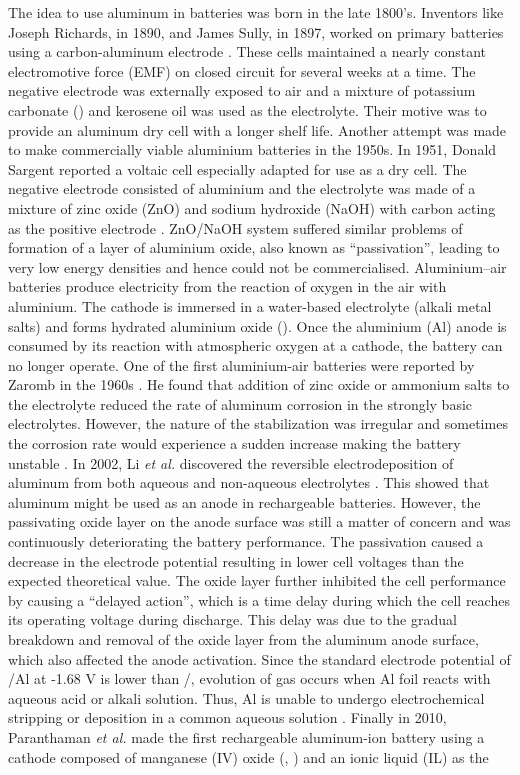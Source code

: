 The idea to use aluminum in batteries was born in the late 1800's. Inventors like Joseph Richards, in 1890, and James Sully, in 1897, worked on primary batteries using a carbon-aluminum electrode \cite{noauthor_james_1897, richards_aluminium_1890}. These cells maintained a nearly constant electromotive force (EMF) on closed circuit for several weeks at a time. The negative electrode was externally exposed to air and a mixture of potassium carbonate () and kerosene oil was used as the electrolyte. Their motive was to provide an aluminum dry cell with a longer shelf life. Another attempt was made to make commercially viable aluminium batteries in the 1950s. In 1951, Donald Sargent reported a voltaic cell especially adapted for use as a dry cell. The negative electrode consisted of aluminium and the electrolyte was made of a mixture of zinc oxide (ZnO) and sodium hydroxide (NaOH) with carbon acting as the positive electrode \cite{sargent_voltaic_1951}. ZnO/NaOH system suffered similar problems of formation of a layer of aluminium oxide, also known as \enquote{passivation}, leading to very low energy densities and hence could not be commercialised. Aluminium–air batteries produce electricity from the reaction of oxygen in the air with aluminium. The cathode is immersed in a water-based electrolyte (alkali metal salts) and forms hydrated aluminium oxide (). Once the aluminium (Al) anode is consumed by its reaction with atmospheric oxygen at a cathode, the battery can no longer operate. One of the first aluminium-air batteries were reported by Zaromb in the 1960s \cite{zaromb_use_1962}. He found that addition of zinc oxide or ammonium salts to the electrolyte reduced the rate of aluminum corrosion in the strongly basic electrolytes. However, the nature of the stabilization was irregular and sometimes the corrosion rate would experience a sudden increase making the battery unstable \cite{bockstie_control_1963}. In 2002, Li \textit{et al.} discovered the reversible electrodeposition of aluminum from both aqueous and non-aqueous electrolytes \cite{li_aluminum_2002}. This showed that aluminum might be used as an anode in rechargeable batteries. However, the passivating oxide layer on the anode surface was still a matter of concern and was continuously deteriorating the battery performance. The passivation caused a decrease in the electrode potential resulting in lower cell voltages than the expected theoretical value. The oxide layer further inhibited the cell performance by causing a \enquote{delayed action}, which is a time delay during which the cell reaches its operating voltage during discharge. This delay was due to the gradual breakdown and removal of the oxide layer from the aluminum anode surface, which also affected the anode activation. Since the standard electrode potential of /Al at -1.68 V is lower than /, evolution of  gas occurs when Al foil reacts with aqueous acid or alkali solution. Thus, Al is unable to undergo electrochemical stripping or deposition in a common aqueous solution \cite{wu_electrochemically_2019}. Finally in 2010, Paranthaman \textit{et al.} made the first rechargeable aluminum-ion battery using a cathode composed of manganese (IV) oxide (, ) and an ionic liquid (IL) as the 